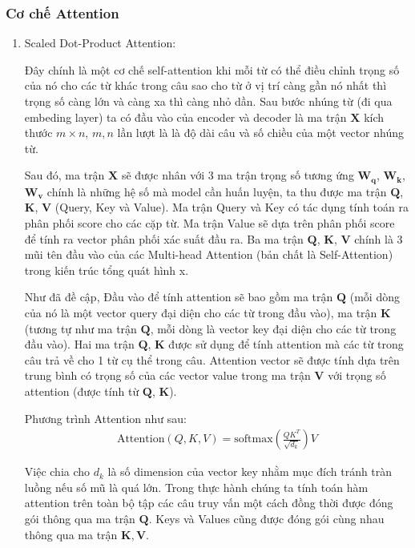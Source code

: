 \subsubsection{Cơ chế Attention}
\begin{enumerate}[label=\textbf{\arabic*}]
    \item Scaled Dot-Product Attention:

          Đây chính là một cơ chế self-attention khi mỗi từ có thể điều chỉnh trọng số của nó cho các từ khác trong câu sao cho từ ở vị trí càng gần nó nhất thì trọng số càng lớn và càng xa thì càng nhỏ dần. Sau bước nhúng từ (đi qua embeding layer) ta có đầu vào của encoder và decoder là ma trận $\mathbf{X}$ kích thước $m\times n$, $m,n$ lần lượt là là độ dài câu và số chiều của một vector nhúng từ.

          Sau đó, ma trận $\mathbf{X}$ sẽ được nhân với 3 ma trận trọng số tương ứng $\mathbf{W}_\mathbf{q}$, $\mathbf{W}_\mathbf{k}$, $\mathbf{W}_\mathbf{v}$ chính là những hệ số mà model cần huấn luyện, ta thu được ma trận $\mathbf{Q}$, $\mathbf{K}$, $\mathbf{V}$ (Query, Key và Value). Ma trận Query và Key có tác dụng tính toán ra phân phối score cho các cặp từ. Ma trận Value sẽ dựa trên phân phối score để tính ra vector phân phối xác suất đầu ra. Ba ma trận $\mathbf{Q}$, $\mathbf{K}$, $\mathbf{V}$ chính là 3 mũi tên đầu vào của các Multi-head Attention (bản chất là Self-Attention) trong kiến trúc tổng quát hình x.

          Như đã đề cập, Đầu vào để tính attention sẽ bao gồm ma trận $\mathbf{Q}$ (mỗi dòng của nó là một vector query đại diện cho các từ trong đầu vào), ma trận $\mathbf{K}$ (tương tự như ma trận $\mathbf{Q}$, mỗi dòng là vector key đại diện cho các từ trong đầu vào). Hai ma trận $\mathbf{Q}$, $\mathbf{K}$ được sử dụng để tính attention mà các từ trong câu trả về cho 1 từ cụ thể trong câu. Attention vector sẽ được tính dựa trên trung bình có trọng số của các vector value trong ma trận $\mathbf{V}$ với trọng số attention (được tính từ $\mathbf{Q}$, $\mathbf{K}$).

          Phương trình Attention như sau:
          \begin{align}
              \mathrm{Attention}(Q, K, V) = \mathrm{softmax}\left(\frac{QK^T}{\sqrt{d_k}}\right)V
          \end{align}

          Việc chia cho $d_k$ là số dimension của vector key nhằm mục đích tránh tràn luồng nếu số mũ là quá lớn.
          Trong thực hành chúng ta tính toán hàm attention trên toàn bộ tập các câu truy vấn một cách đồng thời được đóng gói thông qua ma trận $\mathbf{Q}$. Keys và Values cũng được đóng gói cùng nhau thông qua ma trận $\mathbf{K},\mathbf{V}$.


\end{enumerate}
